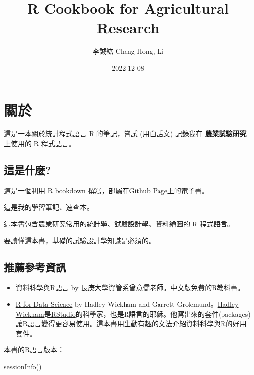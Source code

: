 \documentclass[
]{book}
\title{R Cookbook for Agricultural Research}
\author{李誠紘 Cheng Hong, Li}
\date{2022-12-08}
\newenvironment{Shaded}{\begin{snugshade}}{\end{snugshade}}
\newcommand{\FunctionTok}[1]{\textcolor[rgb]{0.00,0.00,0.00}{#1}}
\newcommand{\NormalTok}[1]{#1}
\begin{document}
\maketitle

{
\setcounter{tocdepth}{1}
\tableofcontents
}
\hypertarget{ux95dcux65bc}{%
\chapter{關於}\label{ux95dcux65bc}}

這是一本關於統計程式語言 R 的筆記，嘗試 (用白話文) 記錄我在 \textbf{農業試驗研究} 上使用的 R 程式語言。

\hypertarget{ux9019ux662fux4ec0ux9ebc}{%
\section{這是什麼?}\label{ux9019ux662fux4ec0ux9ebc}}

這是一個利用 \href{https://zh.wikipedia.org/wiki/R\%E8\%AF\%AD\%E8\%A8\%80}{R} bookdown 撰寫，部屬在Github Page上的電子書。

這是我的學習筆記、速查本。

這本書包含農業研究常用的統計學、試驗設計學、資料繪圖的 R 程式語言。

要讀懂這本書，基礎的試驗設計學知識是必須的。

\hypertarget{ux63a8ux85a6ux53c3ux8003ux8cc7ux8a0a}{%
\section{推薦參考資訊}\label{ux63a8ux85a6ux53c3ux8003ux8cc7ux8a0a}}

\begin{itemize}
\item
  \href{http://yijutseng.github.io/DataScienceRBook/index.html}{資料科學與R語言} by 長庚大學資管系曾意儒老師。中文版免費的R教科書。
\item
  \href{https://r4ds.had.co.nz/index.html}{R for Data Science} by Hadley Wickham and Garrett Grolemund。\href{https://hadley.nz/}{Hadley Wickham}是\href{https://posit.co/download/rstudio-desktop/}{RStudio}的科學家，也是R語言的耶穌。他寫出來的套件(packages)讓R語言變得更容易使用。這本書用生動有趣的文法介紹資料科學與R的好用套件。
\end{itemize}

本書的R語言版本：

\begin{Shaded}
\begin{Highlighting}[]
\FunctionTok{sessionInfo}\NormalTok{()}
\end{Highlighting}
\end{Shaded}
\end{document}
